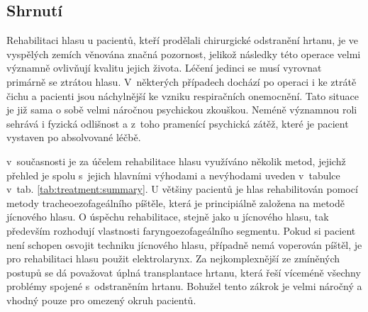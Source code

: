 %


\subsection{Shrnutí} %


Rehabilitaci hlasu u pacientů, kteří prodělali chirurgické odstranění hrtanu, je ve
vyspělých zemích věnována značná pozornost, jelikož následky této operace velmi významně ovlivňují kvalitu jejich života. Léčení jedinci se musí vyrovnat primárně se ztrátou hlasu. V~některých případech dochází po operaci i ke ztrátě čichu a pacienti jsou náchylnější ke vzniku respiračních onemocnění.
Tato situace je již sama o sobě velmi náročnou psychickou zkouškou. Neméně významnou
roli sehrává i fyzická odlišnost a z~toho pramenící psychická zátěž, které je pacient vystaven
po absolvované léčbě.

 v~současnosti je za účelem rehabilitace hlasu využíváno několik metod, jejichž přehled je spolu s~jejich hlavními výhodami a nevýhodami uveden v~tabulce v~tab. \ref{tab:treatment:summary}.
U většiny pacientů je hlas rehabilitován pomocí metody tracheoezofageálního píštěle,
která je principiálně založena na metodě jícnového hlasu. O úspěchu rehabilitace, stejně jako u jícnového hlasu, tak
především rozhodují vlastnosti faryngoezofageálního segmentu. Pokud si pacient
není schopen osvojit techniku jícnového hlasu, případně nemá voperován píštěl, je
pro rehabilitaci hlasu použit elektrolarynx. Za nejkomplexnější ze zmíněných postupů se dá považovat úplná transplantace hrtanu, která
řeší víceméně všechny problémy spojené s~odstraněním hrtanu. Bohužel tento
zákrok je velmi náročný a vhodný pouze pro omezený okruh pacientů.

